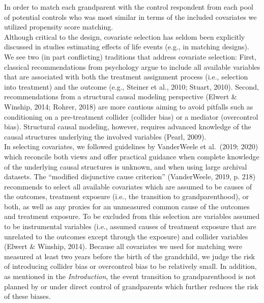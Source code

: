 \documentclass[
  english,
  man, noextraspace]{apa7}
\begin{document}
In order to match each grandparent with the control respondent from each pool of potential controls who was most similar in terms of the included covariates we utilized propensity score matching.\\
Although critical to the design, covariate selection has seldom been explicitly discussed in studies estimating effects of life events (e.g., in matching designs). We see two (in part conflicting) traditions that address covariate selection: First, classical recommendations from psychology argue to include all available variables that are associated with both the treatment assignment process (i.e., selection into treatment) and the outcome (e.g., Steiner et al., 2010; Stuart, 2010). Second, recommendations from a structural causal modeling perspective (Elwert \& Winship, 2014; Rohrer, 2018) are more cautious aiming to avoid pitfalls such as conditioning on a pre-treatment collider (collider bias) or a mediator (overcontrol bias). Structural causal modeling, however, requires advanced knowledge of the causal structures underlying the involved variables (Pearl, 2009).\\
In selecting covariates, we followed guidelines by VanderWeele et al.~(2019; 2020) which reconcile both views and offer practical guidance when complete knowledge of the underlying causal structures is unknown, and when using large archival datasets. The \enquote{modified disjunctive cause criterion} (VanderWeele, 2019, p. 218) recommends to select all available covariates which are assumed to be causes of the outcomes, treatment exposure (i.e., the transition to grandparenthood), or both, as well as any proxies for an unmeasured common cause of the outcomes and treatment exposure. To be excluded from this selection are variables assumed to be instrumental variables (i.e., assumed causes of treatment exposure that are unrelated to the outcomes except through the exposure) and collider variables (Elwert \& Winship, 2014). Because all covariates we used for matching were measured at least two years before the birth of the grandchild, we judge the risk of introducing collider bias or overcontrol bias to be relatively small. In addition, as mentioned in the \emph{Introduction}, the event transition to grandparenthood is not planned by or under direct control of grandparents which further reduces the risk of these biases.\\
\end{document}

